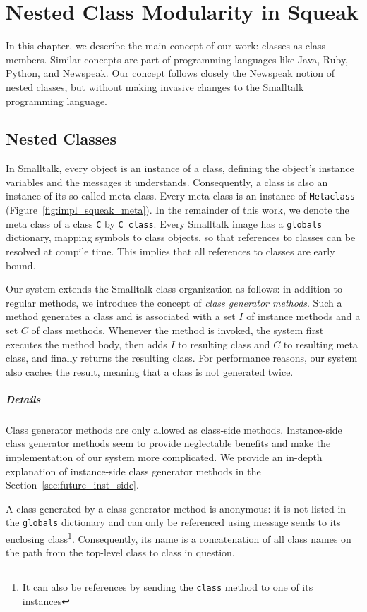 \chapter{Nested Class Modularity in Squeak}
In this chapter, we describe the main concept of our work: classes as class members. Similar concepts are part of programming languages like Java, Ruby, Python, and Newspeak. Our concept follows closely the Newspeak notion of nested classes, but without making invasive changes to the Smalltalk programming language.

\section{Nested Classes}
In Smalltalk, every object is an instance of a class, defining the object's instance variables and the messages it understands. Consequently, a class is also an instance of its so-called meta class. Every meta class is an instance of \texttt{Metaclass} (Figure~\ref{fig:impl_squeak_meta}). In the remainder of this work, we denote the meta class of a class \texttt{C} by \texttt{C class}. Every Smalltalk image has a \texttt{globals} dictionary, mapping symbols to class objects, so that references to classes can be resolved at compile time. This implies that all references to classes are early bound.

Our system extends the Smalltalk class organization as follows: in addition to regular methods, we introduce the concept of \emph{class generator methods}. Such a method generates a class and is associated with a set $I$ of instance methods and a set $C$ of class methods. Whenever the method is invoked, the system first executes the method body, then adds $I$ to resulting class and $C$ to resulting meta class, and finally returns the resulting class. For performance reasons, our system also caches the result, meaning that a class is not generated twice.

\paragraph{Details}
Class generator methods are only allowed as class-side methods. Instance-side class generator methods seem to provide neglectable benefits and make the implementation of our system more complicated. We provide an in-depth explanation of instance-side class generator methods in the Section~\ref{sec:future_inst_side}.

A class generated by a class generator method is anonymous: it is not listed in the \texttt{globals} dictionary and can only be referenced using message sends to its enclosing class\footnote{It can also be references by sending the \texttt{class} method to one of its instances}. Consequently, its name is a concatenation of all class names on the path from the top-level class to class in question.

